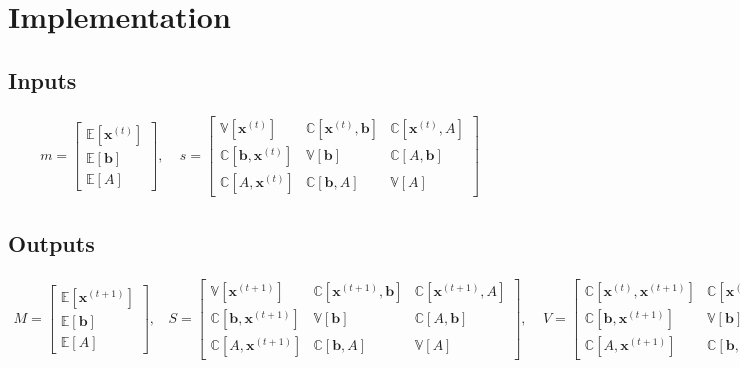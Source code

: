 \documentclass{article}
\newcommand{\vct}{\boldsymbol}
\newcommand{\E}{\mathbb E}
\newcommand{\V}{\mathbb V}
\newcommand{\C}{\mathbb C}
\begin{document}
\section{Implementation}
\subsection{Inputs}
\begin{align*}
m = \left[\begin{array}{c} \E[\vct{x}^{(t)}]  \\ \E[\vct{b}] \\ \E[A] \end{array}\right], \ \ \  \ \ 
s = \left[\begin{array}{ccc}  \V[\vct{x}^{(t)}]                &  \C[\vct{x}^{(t)},\vct{b}]   & \C[\vct{x}^{(t)},A]  \\
                              \C[\vct{b}, \vct{x}^{(t)}]       & \V[\vct{b}]                   &  \C[A, \vct{b}]      
                              \\ \C[A,\vct{x}^{(t)}]            & \C[\vct{b},A]                  & \V[A]
	\end{array}\right]
\end{align*}
\subsection{Outputs}
\begin{align*}
M = \left[\begin{array}{c} \E[\vct{x}^{(t+1)}]  \\ \E[\vct{b}] \\ \E[A] \end{array}\right], \ \ \ \ 
S = 	\left[\begin{array}{ccc}  \V[\vct{x}^{(t+1)}]                &  \C[\vct{x}^{(t+1)},\vct{b}]   & \C[\vct{x}^{(t+1)},A]  \\
                              \C[\vct{b}, \vct{x}^{(t+1)}]       & \V[\vct{b}]                   &  \C[A, \vct{b}]      
                              \\ \C[A,\vct{x}^{(t+1)}]            & \C[\vct{b},A]                  & \V[A]
	\end{array}\right], \ \ \ \ \
V = 	\left[\begin{array}{ccc}  \C[\vct{x}^{(t)}, \vct{x}^{(t+1)}]                &  \C[\vct{x}^{(t)},\vct{b}]   & \C[\vct{x}^{(t)},A]  \\
                              \C[\vct{b}, \vct{x}^{(t+1)}]       & \V[\vct{b}]                   &  \C[A, \vct{b}]      
                              \\ \C[A,\vct{x}^{(t+1)}]            & \C[\vct{b},A]                  & \V[A]
	\end{array}\right]
\end{align*}
\end{document}
